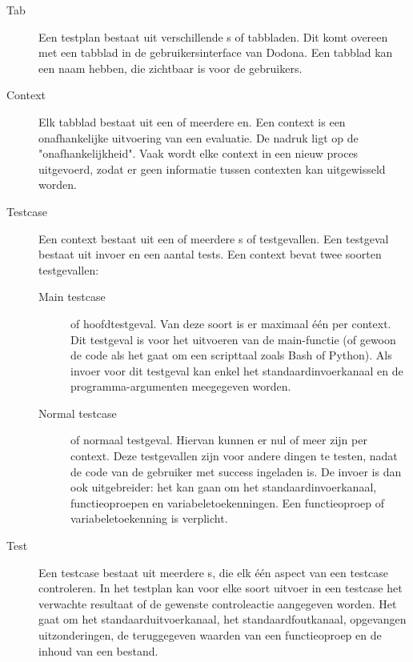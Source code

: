 \begin{description}
    \item[Tab] Een testplan bestaat uit verschillende s of tabbladen.
               Dit komt overeen met een tabblad in de gebruikersinterface van Dodona.
               Een tabblad kan een naam hebben, die zichtbaar is voor de gebruikers.
    \item[Context] Elk tabblad bestaat uit een of meerdere en.
                   Een context is een onafhankelijke uitvoering van een evaluatie.
                   De nadruk ligt op de "onafhankelijkheid".
                   Vaak wordt elke context in een nieuw proces uitgevoerd, zodat er geen informatie tussen contexten kan uitgewisseld worden.
    \item[Testcase] Een context bestaat uit een of meerdere s of testgevallen.
                    Een testgeval bestaat uit invoer en een aantal tests.
                    Een context bevat twee soorten testgevallen:
                    \begin{description}
                        \item[Main testcase] of hoofdtestgeval.
                        Van deze soort is er maximaal één per context.
                        Dit testgeval is voor het uitvoeren van de main-functie (of gewoon de code als het gaat om een scripttaal zoals Bash of Python).
                        Als invoer voor dit testgeval kan enkel het standaardinvoerkanaal en de programma-argumenten meegegeven worden.
                        \item[Normal testcase] of normaal testgeval.
                        Hiervan kunnen er nul of meer zijn per context.
                        Deze testgevallen zijn voor andere dingen te testen, nadat de code van de gebruiker met success ingeladen is.
                        De invoer is dan ook uitgebreider: het kan gaan om het standaardinvoerkanaal, functieoproepen en variabeletoekenningen.
                        Een functieoproep of variabeletoekenning is verplicht.
                    \end{description}
    \item[Test] Een testcase bestaat uit meerdere s, die elk één aspect van een testcase controleren.
                In het testplan kan voor elke soort uitvoer in een testcase het verwachte resultaat of de gewenste controleactie aangegeven worden.
                Het gaat om het standaarduitvoerkanaal, het standaardfoutkanaal, opgevangen uitzonderingen, de teruggegeven waarden van een functieoproep en de inhoud van een bestand.
\end{description}

